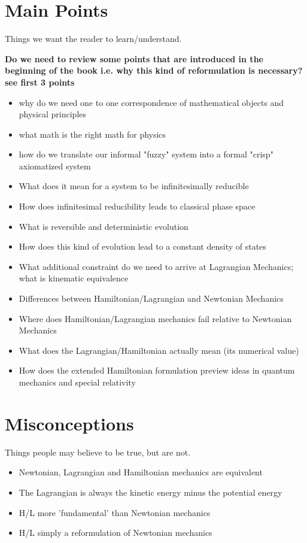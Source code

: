 \documentclass{article}
\begin{document}
\section{Main Points}
Things we want the reader to learn/understand.

\textbf{Do we need to review some points that are introduced in the beginning of the book i.e. why this kind of reformulation is necessary? see first 3 points}
\begin{itemize}

\item why do we need one to one correspondence of mathematical objects and physical principles
\item what math is the right math for physics
\item how do we translate our informal "fuzzy" system into a formal "crisp" axiomatized system

	\item What does it mean for a system to be infinitesimally reducible
	\item How does infinitesimal reducibility leads to classical phase space
	\item What is reversible and deterministic evolution
	\item How does this kind of evolution lead to a constant density of states
	\item What additional constraint do we need to arrive at Lagrangian Mechanics; what is kinematic equivalence
	\item Differences between Hamiltonian/Lagrangian and Newtonian Mechanics
	\item Where does Hamiltonian/Lagrangian mechanics fail relative to Newtonian Mechanics
	\item What does the Lagrangian/Hamiltonian actually mean (its numerical value)
	\item How does the extended Hamiltonian formulation preview ideas in quantum mechanics and special relativity
\end{itemize}


\section{Misconceptions}
Things people may believe to be true, but are not.

\begin{itemize}
	\item Newtonian, Lagrangian and Hamiltonian mechanics are equivalent
	\item The Lagrangian is always the kinetic energy minus the potential energy 
	\item H/L more 'fundamental' than Newtonian mechanics
	\item H/L simply a reformulation of Newtonian mechanics
\end{itemize}
\end{document}
